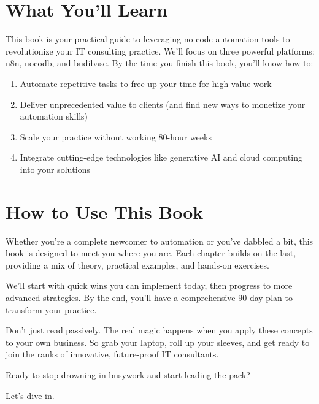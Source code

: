 \section{What You'll Learn}

This book is your practical guide to leveraging no-code automation tools to revolutionize your IT consulting practice. We'll focus on three powerful platforms: n8n, nocodb, and budibase. By the time you finish this book, you'll know how to:

\begin{enumerate}
    \item Automate repetitive tasks to free up your time for high-value work
    \item Deliver unprecedented value to clients (and find new ways to monetize your automation skills)
    \item Scale your practice without working 80-hour weeks
    \item Integrate cutting-edge technologies like generative AI and cloud computing into your solutions
\end{enumerate}


\section{How to Use This Book}

Whether you're a complete newcomer to automation or you've dabbled a bit, this book is designed to meet you where you are. Each chapter builds on the last, providing a mix of theory, practical examples, and hands-on exercises.

We'll start with quick wins you can implement today, then progress to more advanced strategies. By the end, you'll have a comprehensive 90-day plan to transform your practice.

Don't just read passively. The real magic happens when you apply these concepts to your own business. So grab your laptop, roll up your sleeves, and get ready to join the ranks of innovative, future-proof IT consultants.

Ready to stop drowning in busywork and start leading the pack?

Let's dive in.